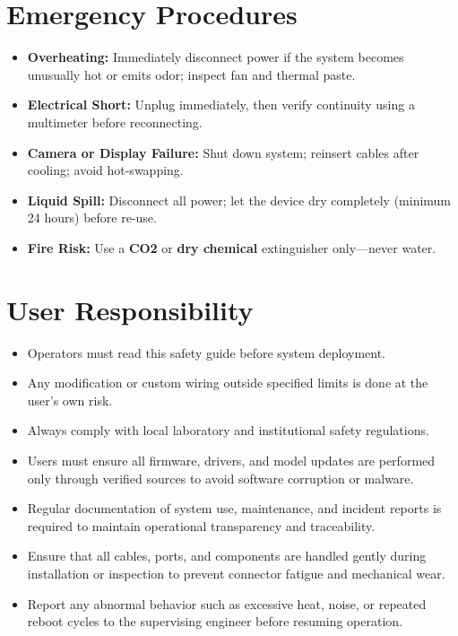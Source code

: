 \vspace{0.4cm}


\section{Emergency Procedures}

\begin{itemize}
	\item \textbf{Overheating:} Immediately disconnect power if the system becomes unusually hot or emits odor; inspect fan and thermal paste.
	\item \textbf{Electrical Short:} Unplug immediately, then verify continuity using a multimeter before reconnecting.
	\item \textbf{Camera or Display Failure:} Shut down system; reinsert cables after cooling; avoid hot-swapping.
	\item \textbf{Liquid Spill:} Disconnect all power; let the device dry completely (minimum 24 hours) before re-use.
	\item \textbf{Fire Risk:} Use a \textbf{CO2} or \textbf{dry chemical} extinguisher only—never water.
\end{itemize}

\vspace{0.4cm}

\section{User Responsibility}

\begin{itemize}
	\item Operators must read this safety guide before system deployment.
	\item Any modification or custom wiring outside specified limits is done at the user’s own risk.
	\item Always comply with local laboratory and institutional safety regulations.
	\item Users must ensure all firmware, drivers, and model updates are performed only through verified sources to avoid software corruption or malware.
	\item Regular documentation of system use, maintenance, and incident reports is required to maintain operational transparency and traceability.
	\item Ensure that all cables, ports, and components are handled gently during installation or inspection to prevent connector fatigue and mechanical wear.  
	\item Report any abnormal behavior such as excessive heat, noise, or repeated reboot cycles to the supervising engineer before resuming operation.  
\end{itemize}


